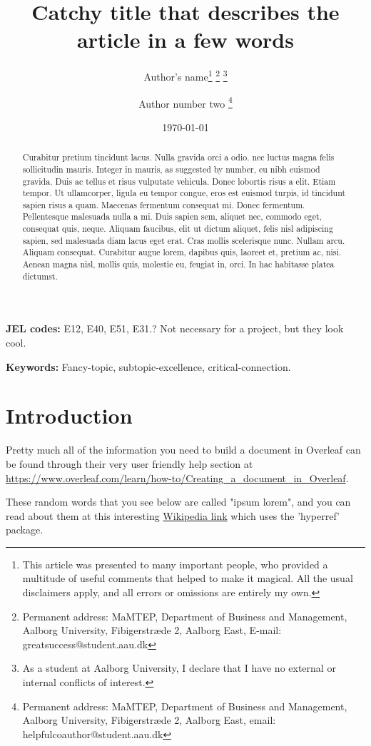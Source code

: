 \documentclass[english,a4paper,12pt]{article}
\title{Catchy title that describes the article in a few words}
\author{Author's name\thanks{This article was presented to many important people, who provided a multitude of useful comments that helped to make it magical. All the usual disclaimers apply, and all errors or omissions are entirely my own.}
\thanks{Permanent address: MaMTEP, Department of Business and Management, Aalborg University, Fibigerstr{\ae}de 2, Aalborg East, E-mail: greatsuccess@student.aau.dk}
\thanks{As a student at Aalborg University, I declare that I have no external or internal conflicts of interest.}
\and Author number two
\thanks{Permanent address: MaMTEP, Department of Business and Management, Aalborg University, Fibigerstr{\ae}de 2, Aalborg East, email: helpfulcoauthor@student.aau.dk}}
\date{\today}
\begin{document}
\linespread{1.0}
\selectfont
\begin{titlepage}
\maketitle
\vspace{2 cm}
\begin{abstract}
\noindent
Curabitur pretium tincidunt lacus. Nulla gravida orci a odio.  nec luctus magna felis sollicitudin mauris. Integer in mauris, as suggested by \cite{baekelbeck2015, bjerg2016} number, eu nibh euismod gravida. Duis ac tellus et risus vulputate vehicula. Donec lobortis risus a elit. Etiam tempor. Ut ullamcorper, ligula eu tempor congue, eros est euismod turpis, id tincidunt sapien risus a quam. Maecenas fermentum consequat mi. Donec fermentum. Pellentesque malesuada nulla a mi. Duis sapien sem, aliquet nec, commodo eget, consequat quis, neque. Aliquam faucibus, elit ut dictum aliquet, felis nisl adipiscing sapien, sed malesuada diam lacus eget erat. Cras mollis scelerisque nunc. Nullam arcu. Aliquam consequat. Curabitur augue lorem, dapibus quis, laoreet et, pretium ac, nisi. Aenean magna nisl, mollis quis, molestie eu, feugiat in, orci. In hac habitasse platea dictumst.
\end{abstract}

\begin{flushleft}
\small{
\vspace{2cm}


\textbf{JEL codes:} E12, E40, E51, E31.? Not necessary for a project, but they look cool.

\vspace{1cm}
\textbf{Keywords:} Fancy-topic, subtopic-excellence, critical-connection.
}
\end{flushleft}
\end{titlepage}

\linespread{1.5}
\selectfont

\section{Introduction} \label{sec:intro}

Pretty much all of the information you need to build a document in Overleaf can be found through their very user friendly help section at \url{https://www.overleaf.com/learn/how-to/Creating_a_document_in_Overleaf}.

These random words that you see below are called "ipsum lorem", and you can read about them at this interesting \href{https://en.wikipedia.org/wiki/Lorem_ipsum}{Wikipedia link}  which uses the 'hyperref' package.
\end{document}
